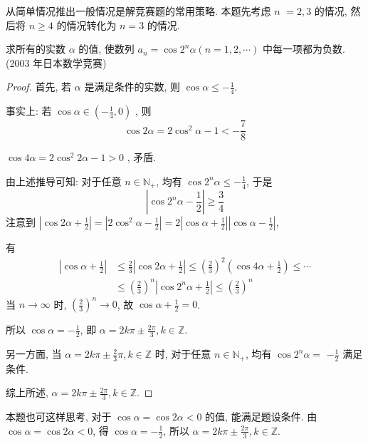 \begin{note}
	从简单情况推出一般情况是解竞赛题的常用策略. 本题先考虑 $n$ $=2,3$ 的情况, 然后将 $n \geqslant 4$ 的情况转化为 $n=3$ 的情况.
\end{note}

\begin{example}
	求所有的实数 $\alpha$ 的值, 使数列 $a_{n}=\cos 2^{n} \alpha(n=1,2, \cdots)$ 中每一项都为负数. (2003 年日本数学竞赛)
\end{example}

\begin{proof}
	首先, 若 $\alpha$ 是满足条件的实数, 则 $\cos \alpha \leqslant-\frac{1}{4}$.

	事实上: 若 $\cos \alpha \in\left(-\frac{1}{4}, 0\right)$ , 则
	$$
		\cos 2 \alpha=2 \cos ^{2} \alpha-1<-\frac{7}{8}
	$$

	$\cos 4 \alpha=2 \cos ^{2} 2 \alpha-1>0$ , 矛盾.

	由上述推导可知: 对于任意 $n \in \mathbb{N}_{+}$, 均有 $\cos 2^{n} \alpha \leqslant-\frac{1}{4}$, 于是
	$$
		\left|\cos 2^{n} \alpha-\frac{1}{2}\right| \geqslant \frac{3}{4}
	$$
	注意到 $\left|\cos 2 \alpha+\frac{1}{2}\right|=\left|2 \cos ^{2} \alpha-\frac{1}{2}\right|=2\left|\cos \alpha+\frac{1}{2}\right|\left|\cos \alpha-\frac{1}{2}\right|$,

	有
	$$
		\begin{aligned}
			\left|\cos \alpha+\frac{1}{2}\right| & \leqslant \frac{2}{3}\left|\cos 2 \alpha+\frac{1}{2}\right| \leqslant\left(\frac{2}{3}\right)^{2}\left(\cos 4 \alpha+\frac{1}{2}\right) \leqslant \cdots \\
			                                     & \leqslant\left(\frac{2}{3}\right)^{n}\left|\cos 2^{n} \alpha+\frac{1}{2}\right| \leqslant\left(\frac{2}{3}\right)^{n}
		\end{aligned}
	$$
	当 $n \rightarrow \infty$ 时, $\left(\frac{2}{3}\right)^{n} \rightarrow 0$, 故 $\cos \alpha+\frac{1}{2}=0$.

	所以 $\cos \alpha=-\frac{1}{2}$, 即 $\alpha=2 k \pi \pm \frac{2 \pi}{3}, k \in \mathbb{Z}$.

	另一方面, 当 $\alpha=2 k \pi \pm \frac{2}{3} \pi, k \in \mathbb{Z}$ 时, 对于任意 $n \in \mathbb{N}_{+}$, 均有 $\cos 2^{n} \alpha=$ $-\frac{1}{2}$ 满足条件.

	综上所述, $\alpha=2 k \pi \pm \frac{2 \pi}{3}, k \in \mathbb{Z}$.
\end{proof}
\begin{note}
	本题也可这样思考, 对于 $\cos \alpha=\cos 2 \alpha<0$ 的值, 能满足题设条件. 由 $\cos \alpha=\cos 2 \alpha<0$, 得 $\cos \alpha=-\frac{1}{2}$, 所以 $\alpha=2 k \pi \pm \frac{2 \pi}{3}, k \in \mathbb{Z}$.
\end{note}

